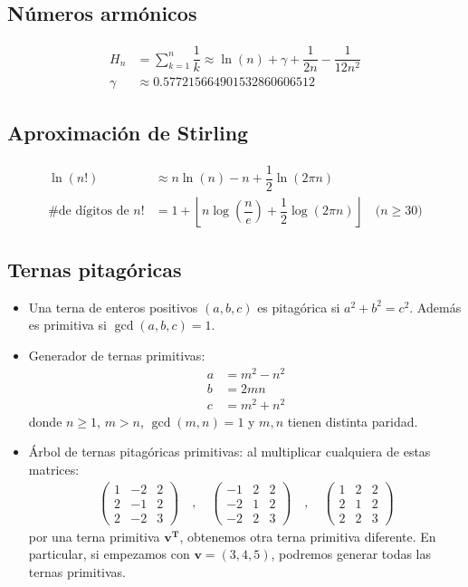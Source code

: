 	\subsection{Números armónicos}
		\begin{align*}
			H_n &= \sum_{k=1}^{n} \dfrac{1}{k} \approx \ln(n) + \gamma + \dfrac{1}{2n} - \dfrac{1}{12n^2} \\
			\gamma &\approx 0.577215664901532860606512
		\end{align*}
	
	\subsection{Aproximación de Stirling}
		\begin{align*}
			\ln(n!) &\approx n\ln(n) - n + \dfrac{1}{2}\ln(2 \pi n) \\
			\text{\# de dígitos de $n!$} &= 1 + \left\lfloor n\log\left(\dfrac{n}{e}\right) + \dfrac{1}{2}\log(2 \pi n) \right\rfloor \quad \text{($n \geq 30$)}
		\end{align*}
	
	\subsection{Ternas pitagóricas}
		\begin{itemize}
			\item Una terna de enteros positivos $(a,b,c)$ es pitagórica si $a^2+b^2=c^2$. Además es primitiva si $\gcd(a,b,c)=1$.
			\item Generador de ternas primitivas:
			\begin{align*}
				a &= m^2-n^2 \\
				b &= 2mn \\
				c &= m^2+n^2
			\end{align*}
			donde $n \geq 1$, $m>n$, $\gcd(m,n)=1$ y $m,n$ tienen distinta paridad.
			\item Árbol de ternas pitagóricas primitivas: al multiplicar cualquiera de estas matrices:
			\begin{align*}
				\begin{pmatrix}
					1 & -2 & 2 \\
					2 & -1 & 2 \\
					2 & -2 & 3
				\end{pmatrix} \quad , \quad
				\begin{pmatrix}
					-1 & 2 & 2 \\
					-2 & 1 & 2 \\
					-2 & 2 & 3
				\end{pmatrix} \quad , \quad
				\begin{pmatrix}
					1 & 2 & 2 \\
					2 & 1 & 2 \\
					2 & 2 & 3
				\end{pmatrix}
			\end{align*}
			por una terna primitiva $\mathbf{v^T}$, obtenemos otra terna primitiva diferente. En particular, si empezamos con $\mathbf{v}=(3,4,5)$, podremos generar todas las ternas primitivas.
		\end{itemize}

